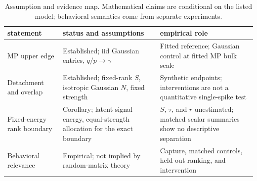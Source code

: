 \begin{table}[t]
\centering
\caption{Assumption and evidence map. Mathematical claims are conditional on the
listed model; behavioral semantics come from separate experiments.}
\label{tab:assumption-map}
\footnotesize
\begin{tabular}{>{\raggedright\arraybackslash}p{}>{\raggedright\arraybackslash}p{}>{\raggedright\arraybackslash}p{}}
\toprule
statement & status and assumptions & empirical role \\
\midrule
MP upper edge & Established; iid Gaussian entries, $q/p\to\gamma$ & Fitted
reference; Gaussian control at fitted MP bulk scale \\
Detachment and overlap & Established; fixed-rank $S$, isotropic Gaussian $N$,
fixed strength & Synthetic endpoints; interventions are not a quantitative
single-spike test \\
Fixed-energy rank boundary & Corollary; latent signal energy, equal-strength
allocation for the exact boundary & $S$, $\tau$, and $r$ unestimated; matched
scalar summaries show no descriptive separation \\
Behavioral relevance & Empirical; not implied by random-matrix theory & Capture,
matched controls, held-out ranking, and intervention \\
\bottomrule
\end{tabular}
\end{table}
